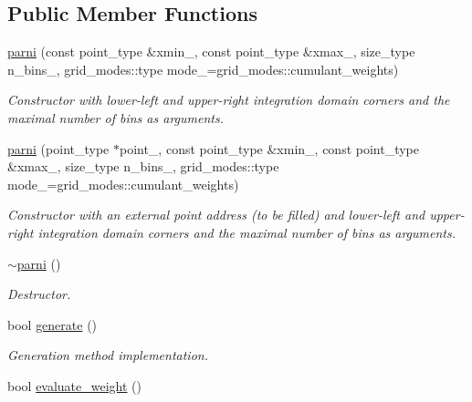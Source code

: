 \subsection*{Public Member Functions}
\begin{DoxyCompactItemize}
\item 
\hyperlink{a00385_a3a602696cc9c190dd9fece7a7e1c9aa1}{parni} (const point\-\_\-type \&xmin\-\_\-, const point\-\_\-type \&xmax\-\_\-, size\-\_\-type n\-\_\-bins\-\_, grid\-\_\-modes\-::type mode\-\_\-=grid\-\_\-modes\-::cumulant\-\_\-weights)
\begin{DoxyCompactList}\small\item\em Constructor with lower-\/left and upper-\/right integration domain corners and the maximal number of bins as arguments. \end{DoxyCompactList}\item 
\hyperlink{a00385_a334af27545cc2f915a6da5431bdaa0ff}{parni} (point\-\_\-type $\ast$point\-\_\-, const point\-\_\-type \&xmin\-\_\-, const point\-\_\-type \&xmax\-\_\-, size\-\_\-type n\-\_\-bins\-\_, grid\-\_\-modes\-::type mode\-\_\-=grid\-\_\-modes\-::cumulant\-\_\-weights)
\begin{DoxyCompactList}\small\item\em Constructor with an external point address (to be filled) and lower-\/left and upper-\/right integration domain corners and the maximal number of bins as arguments. \end{DoxyCompactList}\item 
\hypertarget{a00385_a9fab247a166421bac36ced355ed01e9a}{\hyperlink{a00385_a9fab247a166421bac36ced355ed01e9a}{$\sim$parni} ()}\label{a00385_a9fab247a166421bac36ced355ed01e9a}

\begin{DoxyCompactList}\small\item\em Destructor. \end{DoxyCompactList}\item 
\hypertarget{a00385_a70e97a80af86d90e73603ba9f21b446d}{bool \hyperlink{a00385_a70e97a80af86d90e73603ba9f21b446d}{generate} ()}\label{a00385_a70e97a80af86d90e73603ba9f21b446d}

\begin{DoxyCompactList}\small\item\em Generation method implementation. \end{DoxyCompactList}\item 
\hypertarget{a00385_aae06454f775452b7d0615c09bf9b6142}{bool \hyperlink{a00385_aae06454f775452b7d0615c09bf9b6142}{evaluate\-\_\-weight} ()}\label{a00385_aae06454f775452b7d0615c09bf9b6142}


\end{DoxyCompactItemize}
